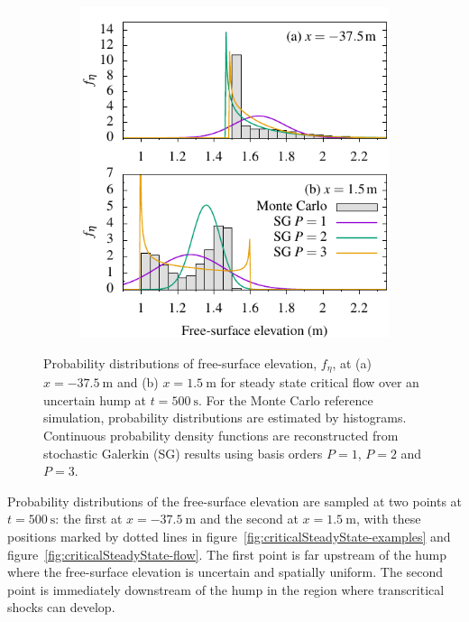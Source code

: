 \begin{figure}
    \centering
    \begin{subfigure}{\textwidth}
    \label{fig:criticalSteadyState-pdf:upstream}
    \label{fig:criticalSteadyState-pdf:downstream}
    \centering
    \includegraphics{fig-criticalSteadyState-pdf.pdf}
    \end{subfigure}
    \caption{Probability distributions of free-surface elevation, $f_\eta$, at (a) $x = \SI{-37.5}{\meter}$ and (b) $x = \SI{1.5}{\meter}$ for steady state critical flow over an uncertain hump at $t = \SI{500}{\second}$.
    For the Monte Carlo reference simulation, probability distributions are estimated by histograms.
    Continuous probability density functions are reconstructed from stochastic Galerkin (SG) results using basis orders $P=1$, $P=2$ and $P=3$.}
    \label{fig:criticalSteadyState-pdf}
\end{figure}

Probability distributions of the free-surface elevation are sampled at two points at $t =
\SI{500}{\second}$: the first at $x =
\SI{-37.5}{\meter}$ and the second at $x
= \SI{1.5}{\meter}$, with these positions marked by dotted lines in
figure~\ref{fig:criticalSteadyState-examples} and
figure~\ref{fig:criticalSteadyState-flow}.
The first point is far upstream of the hump where the free-surface elevation is uncertain and spatially uniform.
The second point is immediately downstream of the hump in the region where transcritical shocks can develop.

